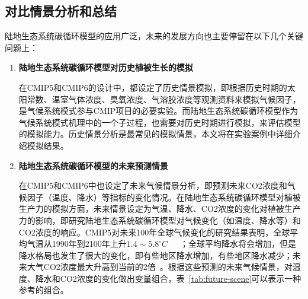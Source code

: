 \subsection{对比情景分析和总结}
\label{sec:scene}
陆地生态系统碳循环模型的应用广泛，未来的发展方向也主要停留在以下几个关键问题上：
\begin{enumerate}[(1)]
\item \textbf{陆地生态系统碳循环模型对历史植被生长的模拟}

在CMIP5和CMIP6的设计中，都设定了历史情景模拟，即根据历史时期的太阳常数、温室气体浓度、臭氧浓度、气溶胶浓度等观测资料来模拟气候因子，是气候系统模式参与CMIP项目的必要实验。而陆地生态系统碳循环模型作为气候系统模式机理中的一个子过程，也需要对历史时期进行模拟，来评估模型的模拟能力。历史情景分析是最常见的模拟情景，本文将在实验案例中详细介绍模拟结果。

\item \textbf{陆地生态系统碳循环模型的未来预测情景}

在CMIP5和CMIP6中也设定了未来气候情景分析，即预测未来CO2浓度和气候因子（温度、降水）等指标的变化情况。在陆地生态系统碳循环模型对植被生产力的模拟方面，未来情景设定为气温、降水、CO2浓度的变化对植被生产力的影响，即研究陆地生态系统碳循环模型对气候变化（如温度、降水等）和CO2浓度的响应。CMIP5对未来100年全球气候变化的研究结果表明，全球平均气温从1990年到2100年上升$1.4\sim5.8^{\circ}C$~\cite{houghton2001climate}~\cite{王绍武1995未来}~\cite{秦大河2003气候变化的事实与影响及对策}；全球平均降水将会增加，但是降水格局也发生了很大的变化，即有些地区降水增加，有些地区降水减少；未来大气CO2浓度最大升高到当前的2倍~\cite{griggs2002climate}。根据这些预测的未来气候情景，对温度、降水和CO2浓度的变化做出变量组合，表~\ref{tab:future-scene}可以表示一种参考的组合。


\end{enumerate}
